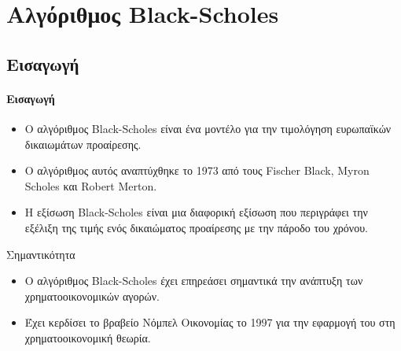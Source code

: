 \chapter{Αλγόριθμος Black-Scholes}
\label{chap:black_scholes}

\section{Εισαγωγή}
\begin{frame}
  \frametitle{Εισαγωγή}
  \begin{itemize}
    \item Ο αλγόριθμος Black-Scholes είναι ένα μοντέλο για την τιμολόγηση ευρωπαϊκών δικαιωμάτων προαίρεσης.
    \item Ο αλγόριθμος αυτός αναπτύχθηκε το 1973 από τους Fischer Black, Myron Scholes και Robert Merton.
    \item Η εξίσωση Black-Scholes είναι μια διαφορική εξίσωση που περιγράφει την εξέλιξη της τιμής ενός δικαιώματος προαίρεσης με την πάροδο του χρόνου.
  \end{itemize}

  \begin{block}{Σημαντικότητα}
    \begin{itemize}
      \item Ο αλγόριθμος Black-Scholes έχει επηρεάσει σημαντικά την ανάπτυξη των χρηματοοικονομικών αγορών.
      \item Έχει κερδίσει το βραβείο Νόμπελ Οικονομίας το 1997 για την εφαρμογή του στη χρηματοοικονομική θεωρία.
    \end{itemize}
  \end{block}
\end{frame}

